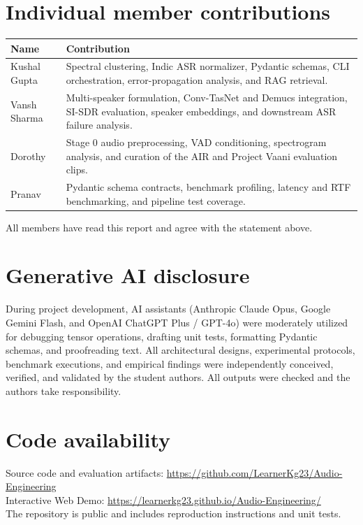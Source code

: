 \documentclass[11pt,a4paper,twocolumn]{article}
\newcommand{\githuburl}{https://github.com/LearnerKg23/Audio-Engineering}
\newcommand{\demourl}{https://learnerkg23.github.io/Audio-Engineering/}
\begin{document}
\section*{Individual member contributions}
{\small
\begin{tabularx}{\linewidth}{@{}l X@{}}
\toprule
\textbf{Name} & \textbf{Contribution} \\
\midrule
Kushal Gupta & Spectral clustering, Indic ASR normalizer, Pydantic schemas, CLI orchestration, error-propagation analysis, and RAG retrieval. \\
Vansh Sharma & Multi-speaker formulation, Conv-TasNet and Demucs integration, SI-SDR evaluation, speaker embeddings, and downstream ASR failure analysis. \\
Dorothy & Stage 0 audio preprocessing, VAD conditioning, spectrogram analysis, and curation of the AIR and Project Vaani evaluation clips. \\
Pranav & Pydantic schema contracts, benchmark profiling, latency and RTF benchmarking, and pipeline test coverage. \\
\bottomrule
\end{tabularx}}

\smallskip
\noindent All members have read this report and agree with the statement above.

\section*{Generative AI disclosure}
During project development, AI assistants (Anthropic Claude Opus, Google Gemini Flash, and OpenAI ChatGPT Plus / GPT-4o) were moderately utilized for debugging tensor operations, drafting unit tests, formatting Pydantic schemas, and proofreading text. All architectural designs, experimental protocols, benchmark executions, and empirical findings were independently conceived, verified, and validated by the student authors. All outputs were checked and the authors take responsibility.

\section*{Code availability}
\noindent Source code and evaluation artifacts: \url{\githuburl}\\
\noindent Interactive Web Demo: \url{\demourl}\\
The repository is public and includes reproduction instructions and unit tests.
\end{document}
